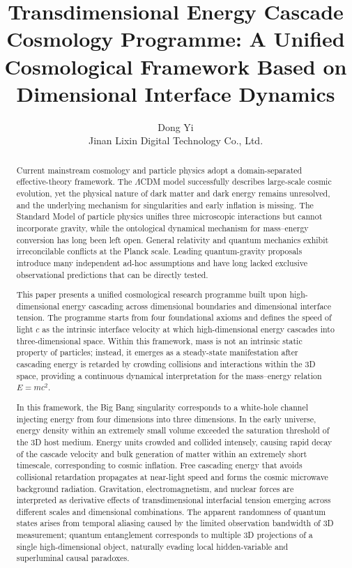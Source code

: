 \documentclass[12pt,a4paper]{article}
\title{Transdimensional Energy Cascade Cosmology Programme: A Unified Cosmological Framework Based on Dimensional Interface Dynamics}
\author{Dong Yi \\ Jinan Lixin Digital Technology Co., Ltd.}
\date{}
\begin{document}
\maketitle

\begin{abstract}
Current mainstream cosmology and particle physics adopt a domain-separated effective-theory framework. The $\Lambda$CDM model successfully describes large-scale cosmic evolution, yet the physical nature of dark matter and dark energy remains unresolved, and the underlying mechanism for singularities and early inflation is missing. The Standard Model of particle physics unifies three microscopic interactions but cannot incorporate gravity, while the ontological dynamical mechanism for mass–energy conversion has long been left open. General relativity and quantum mechanics exhibit irreconcilable conflicts at the Planck scale. Leading quantum-gravity proposals introduce many independent ad-hoc assumptions and have long lacked exclusive observational predictions that can be directly tested.

This paper presents a unified cosmological research programme built upon high-dimensional energy cascading across dimensional boundaries and dimensional interface tension. The programme starts from four foundational axioms and defines the speed of light $c$ as the intrinsic interface velocity at which high-dimensional energy cascades into three-dimensional space. Within this framework, mass is not an intrinsic static property of particles; instead, it emerges as a steady-state manifestation after cascading energy is retarded by crowding collisions and interactions within the 3D space, providing a continuous dynamical interpretation for the mass–energy relation $E=mc^2$.

In this framework, the Big Bang singularity corresponds to a white-hole channel injecting energy from four dimensions into three dimensions. In the early universe, energy density within an extremely small volume exceeded the saturation threshold of the 3D host medium. Energy units crowded and collided intensely, causing rapid decay of the cascade velocity and bulk generation of matter within an extremely short timescale, corresponding to cosmic inflation. Free cascading energy that avoids collisional retardation propagates at near-light speed and forms the cosmic microwave background radiation. Gravitation, electromagnetism, and nuclear forces are interpreted as derivative effects of transdimensional interfacial tension emerging across different scales and dimensional combinations. The apparent randomness of quantum states arises from temporal aliasing caused by the limited observation bandwidth of 3D measurement; quantum entanglement corresponds to multiple 3D projections of a single high-dimensional object, naturally evading local hidden-variable and superluminal causal paradoxes.


\end{abstract}
\end{document}
